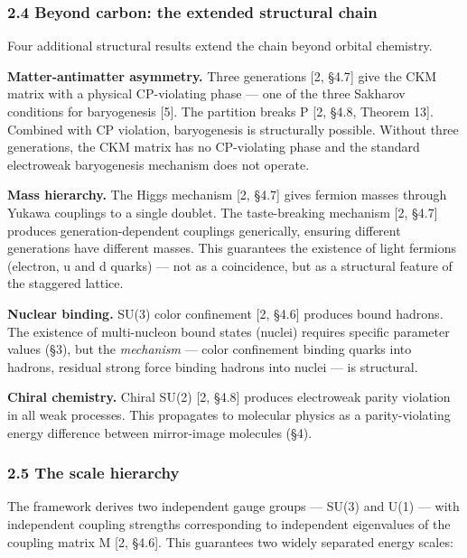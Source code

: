 \documentclass[
]{article}
\begin{document}
\hypertarget{beyond-carbon-the-extended-structural-chain}{%
\subsubsection{2.4 Beyond carbon: the extended structural
chain}\label{beyond-carbon-the-extended-structural-chain}}

Four additional structural results extend the chain beyond orbital
chemistry.

\textbf{Matter-antimatter asymmetry.} Three generations {[}2, §4.7{]}
give the CKM matrix with a physical CP-violating phase --- one of the
three Sakharov conditions for baryogenesis {[}5{]}. The partition breaks
P {[}2, §4.8, Theorem 13{]}. Combined with CP violation, baryogenesis is
structurally possible. Without three generations, the CKM matrix has no
CP-violating phase and the standard electroweak baryogenesis mechanism
does not operate.

\textbf{Mass hierarchy.} The Higgs mechanism {[}2, §4.7{]} gives fermion
masses through Yukawa couplings to a single doublet. The taste-breaking
mechanism {[}2, §4.7{]} produces generation-dependent couplings
generically, ensuring different generations have different masses. This
guarantees the existence of light fermions (electron, u and d quarks)
--- not as a coincidence, but as a structural feature of the staggered
lattice.

\textbf{Nuclear binding.} SU(3) color confinement {[}2, §4.6{]} produces
bound hadrons. The existence of multi-nucleon bound states (nuclei)
requires specific parameter values (§3), but the \emph{mechanism} ---
color confinement binding quarks into hadrons, residual strong force
binding hadrons into nuclei --- is structural.

\textbf{Chiral chemistry.} Chiral SU(2) {[}2, §4.8{]} produces
electroweak parity violation in all weak processes. This propagates to
molecular physics as a parity-violating energy difference between
mirror-image molecules (§4).

\hypertarget{the-scale-hierarchy}{%
\subsubsection{2.5 The scale hierarchy}\label{the-scale-hierarchy}}

The framework derives two independent gauge groups --- SU(3) and U(1)
--- with independent coupling strengths corresponding to independent
eigenvalues of the coupling matrix M {[}2, §4.6{]}. This guarantees two
widely separated energy scales:
\end{document}
